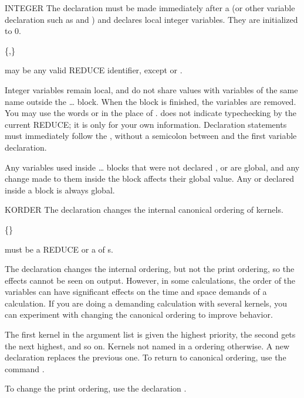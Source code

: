 \begin{Declaration}{INTEGER}
The  declaration must be made immediately after a
 (or other variable declaration such as 
and ) and declares local integer variables.  They are
initialized to 0.
\begin{Syntax}
 \{,\}\optional
\end{Syntax}

 may be any valid REDUCE identifier, except
 or .

\begin{Comments}
Integer variables remain local, and do not share values with variables of
the same name outside the \ldots{} block.  When the
block is finished, the variables are removed.  You may use the words
 or  in the place of .
 does not indicate typechecking by the
current REDUCE; it is only for your own information.  Declaration
statements must immediately follow the , without a semicolon
between  and the first variable declaration.

Any variables used inside \ldots{} blocks that were not
declared ,  or  are global, and any
change made to them inside the block affects their global value.  Any
 or  declared inside a block is always global.
\end{Comments}
\end{Declaration}


\begin{Declaration}{KORDER}
The  declaration changes the internal canonical ordering of
kernels.
\begin{Syntax}
 \{\name{,}\}\optional
\end{Syntax}

 must be a REDUCE  or a  of
s.

\begin{Comments}
The declaration  changes the internal ordering, but not the print
ordering, so the effects cannot be seen on output.  However, in some 
calculations, the order of the variables can have significant effects on the 
time and space demands of a calculation.  If you are doing a demanding 
calculation with several kernels, you can experiment with changing the 
canonical ordering to improve behavior.

The first kernel in the argument list is given the highest priority, the
second gets the next highest, and so on.  Kernels not named in a
 ordering otherwise.  A new  declaration replaces 
the previous one.  To return to canonical ordering, use the command 
.

To change the print ordering, use the declaration .
\end{Comments}
\end{Declaration}


